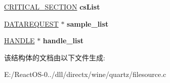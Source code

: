 \begin{DoxyCompactItemize}
\item 
\mbox{\label{struct_file_async_reader_a24d8fc5cde6c30c59410444e49b882f9}} 
\hyperlink{struct___c_r_i_t_i_c_a_l___s_e_c_t_i_o_n}{C\+R\+I\+T\+I\+C\+A\+L\+\_\+\+S\+E\+C\+T\+I\+ON} {\bfseries cs\+List}
\item 
\mbox{\label{struct_file_async_reader_aba5e4f30ef1ea6522830dadc1496c9cc}} 
\hyperlink{struct_d_a_t_a_r_e_q_u_e_s_t}{D\+A\+T\+A\+R\+E\+Q\+U\+E\+ST} $\ast$ {\bfseries sample\+\_\+list}
\item 
\mbox{\label{struct_file_async_reader_a2eaef6b84d14c21b5902cd6e13a4331a}} 
\hyperlink{interfacevoid}{H\+A\+N\+D\+LE} $\ast$ {\bfseries handle\+\_\+list}
\end{DoxyCompactItemize}


该结构体的文档由以下文件生成\+:\begin{DoxyCompactItemize}
\item 
E\+:/\+React\+O\+S-\/0../dll/directx/wine/quartz/filesource.\+c\end{DoxyCompactItemize}
